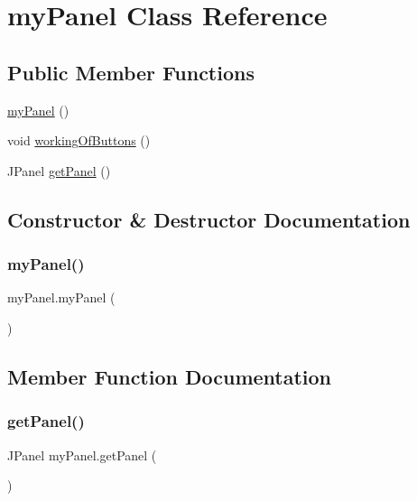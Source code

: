 \hypertarget{classmy_panel}{}\section{my\+Panel Class Reference}
\label{classmy_panel}
\subsection*{Public Member Functions}
\begin{DoxyCompactItemize}
\item 
\hyperlink{classmy_panel_ab3caf63718b52c0f771983dc83b2d950}{my\+Panel} ()
\item 
void \hyperlink{classmy_panel_ac67bebd824b15236aa5213673cd49c88}{working\+Of\+Buttons} ()
\item 
J\+Panel \hyperlink{classmy_panel_a259592e52478c99ae70c9e962ad17236}{get\+Panel} ()
\end{DoxyCompactItemize}


\subsection{Constructor \& Destructor Documentation}
\hypertarget{classmy_panel_ab3caf63718b52c0f771983dc83b2d950}{}\label{classmy_panel_ab3caf63718b52c0f771983dc83b2d950} 
\subsubsection{\texorpdfstring{my\+Panel()}{myPanel()}}
{\footnotesize\ttfamily my\+Panel.\+my\+Panel (\begin{DoxyParamCaption}{ }\end{DoxyParamCaption})}



\subsection{Member Function Documentation}
\hypertarget{classmy_panel_a259592e52478c99ae70c9e962ad17236}{}\label{classmy_panel_a259592e52478c99ae70c9e962ad17236} 
\subsubsection{\texorpdfstring{get\+Panel()}{getPanel()}}
{\footnotesize\ttfamily J\+Panel my\+Panel.\+get\+Panel (\begin{DoxyParamCaption}{ }\end{DoxyParamCaption})}

